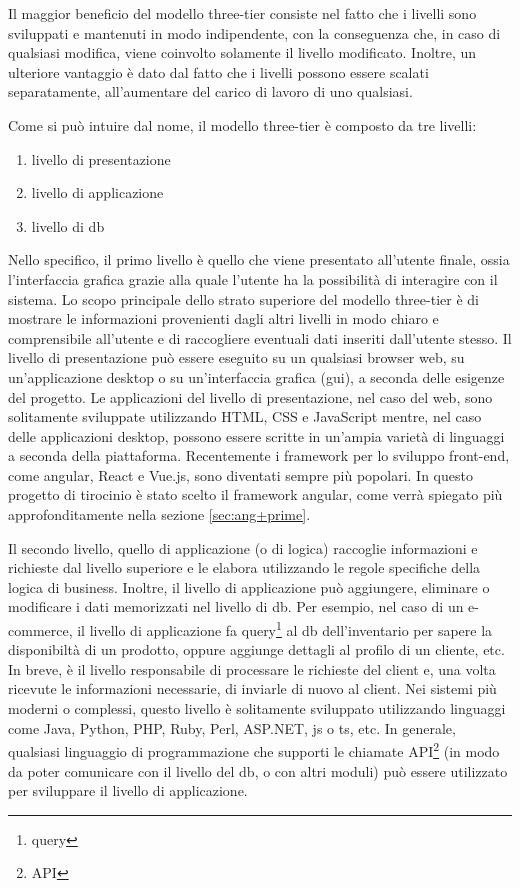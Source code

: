 Il maggior beneficio del modello three-tier consiste nel fatto che i livelli sono sviluppati e mantenuti in modo indipendente, con la conseguenza che, in caso di qualsiasi modifica, viene coinvolto solamente il livello modificato. Inoltre, un ulteriore vantaggio è dato dal fatto che i livelli possono essere scalati separatamente, all'aumentare del carico di lavoro di uno qualsiasi.

Come si può intuire dal nome, il modello three-tier è composto da tre livelli: 
\begin{enumerate}
\item livello di presentazione
\item livello di applicazione
\item livello di \acrlong{db}
\end{enumerate}

Nello specifico, il primo livello è quello che viene presentato all'utente finale, ossia l'interfaccia grafica grazie alla quale l'utente ha la possibilità di interagire con il sistema. Lo scopo principale dello strato superiore del modello three-tier è di mostrare le informazioni provenienti dagli altri livelli in modo chiaro e comprensibile all'utente e di raccogliere eventuali dati inseriti dall'utente stesso.
Il livello di presentazione può essere eseguito su un qualsiasi browser web, su un'applicazione desktop o su un'interfaccia grafica (\acrshort{gui}), a seconda delle esigenze del progetto.
Le applicazioni del livello di presentazione, nel caso del web, sono solitamente sviluppate utilizzando HTML, CSS e JavaScript mentre, nel caso delle applicazioni desktop, possono essere scritte in un'ampia varietà di linguaggi a seconda della piattaforma. Recentemente i \gls{framework} per lo sviluppo front-end, come \gls{angular}, React e Vue.js, sono diventati sempre più popolari. In questo progetto di tirocinio è stato scelto il \gls{framework} \gls{angular}, come verrà spiegato più approfonditamente nella sezione \ref{sec:ang+prime}.

Il secondo livello, quello di applicazione (o di logica) raccoglie informazioni e richieste dal livello superiore e le elabora utilizzando le regole specifiche della logica di business. Inoltre, il livello di applicazione può aggiungere, eliminare o modificare i dati memorizzati nel livello di \acrlong{db}. Per esempio, nel caso di un e-commerce, il livello di applicazione fa query\footnote{\glsdesc{query}} al \acrlong{db} dell'inventario per sapere la disponibiltà di un prodotto, oppure aggiunge dettagli al profilo di un cliente, etc.
In breve, è il livello responsabile di processare le richieste del client e, una volta ricevute le informazioni necessarie, di inviarle di nuovo al client.
Nei sistemi più moderni o complessi, questo livello è solitamente sviluppato utilizzando linguaggi come Java, Python, PHP, Ruby, Perl, ASP.NET, \acrlong{js} o \acrlong{ts}, etc. In generale, qualsiasi linguaggio di programmazione che supporti le chiamate \gls{API}\footnote{\glsdesc{API}} (in modo da poter comunicare con il livello del \acrlong{db}, o con altri moduli) può essere utilizzato per sviluppare il livello di applicazione.

